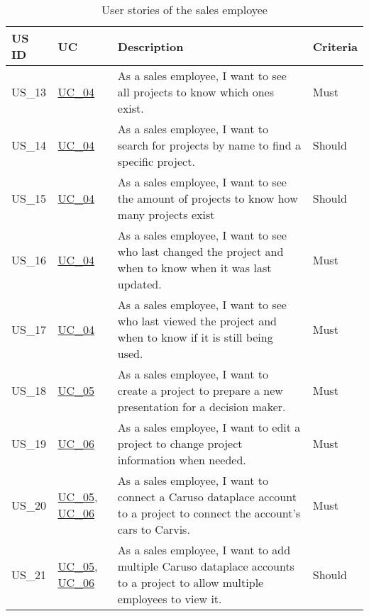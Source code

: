   \sffamily
  \begin{footnotesize}
    \begin{longtable}[L L L L]{ p{} p{} p{} p{} }
      \caption                       %
          {User stories of the sales employee} %
          \\
      \toprule
      \textbf{US ID} & \textbf{UC} & \textbf{Description} & \textbf{Criteria} \\
      \midrule
      \hypertarget{Ref:US13}{US\_13} & \hyperlink{Ref:UC4}{UC\_04} & As a sales employee, I want to see all projects to know which ones exist. & Must \\
      \hypertarget{Ref:US14}{US\_14} & \hyperlink{Ref:UC4}{UC\_04} & As a sales employee, I want to search for projects by name to find a specific project. & Should \\
      \hypertarget{Ref:US15}{US\_15} & \hyperlink{Ref:UC4}{UC\_04} & As a sales employee, I want to see the amount of projects to know how many projects exist & Should \\
      \hypertarget{Ref:US16}{US\_16} & \hyperlink{Ref:UC4}{UC\_04} & As a sales employee, I want to see who last changed the project and when to know when it was last updated. & Must \\
      \hypertarget{Ref:US17}{US\_17} & \hyperlink{Ref:UC4}{UC\_04} & As a sales employee, I want to see who last viewed the project and when to know if it is still being used. & Must \\
      \hypertarget{Ref:US18}{US\_18} & \hyperlink{Ref:UC5}{UC\_05} & As a sales employee, I want to create a project to prepare a new presentation for a decision maker. & Must \\
      \hypertarget{Ref:US19}{US\_19} & \hyperlink{Ref:UC6}{UC\_06} & As a sales employee, I want to edit a project to change project information when needed. & Must \\
      \hypertarget{Ref:US20}{US\_20} & \hyperlink{Ref:UC5}{UC\_05}, \newline \hyperlink{Ref:UC6}{UC\_06} & As a sales employee, I want to connect a Caruso dataplace account to a project to connect the account's cars to Carvis. & Must \\
      \hypertarget{Ref:US21}{US\_21} & \hyperlink{Ref:UC5}{UC\_05}, \newline \hyperlink{Ref:UC6}{UC\_06} & As a sales employee, I want to add multiple Caruso dataplace accounts to a project to allow multiple employees to view it. & Should \\

\end{longtable}
\end{footnotesize}
